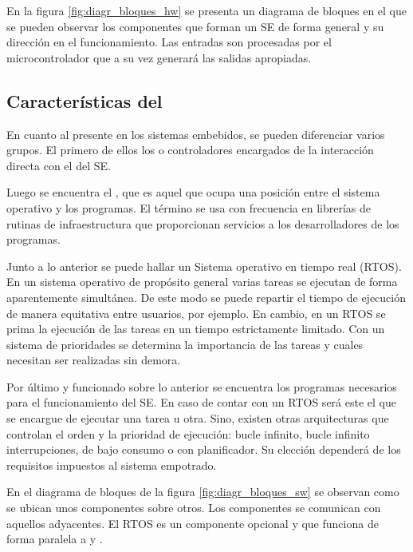 En la figura \ref{fig:diagr_bloques_hw} se presenta un diagrama de bloques
en el que se pueden observar los componentes que forman un SE de forma general
y su dirección en el funcionamiento. Las entradas son procesadas por el
microcontrolador que a su vez generará las salidas apropiadas.


\subsection{Características del }{\label{sec:se-sw}}
En cuanto al  presente en los sistemas embebidos, se
pueden diferenciar varios grupos. El primero de ellos los
 o controladores encargados de la interacción directa
con el  del SE.

Luego se encuentra el , que es aquel
 que ocupa una posición entre el sistema operativo y los
programas. El término se usa con frecuencia en librerías de rutinas de
infraestructura que proporcionan servicios a los desarrolladores de los
programas. \cite{butterfield2016}

Junto a lo anterior se puede hallar un Sistema operativo en tiempo real (RTOS).
En un sistema operativo de propósito general varias tareas se ejecutan de forma
aparentemente simultánea. De este modo se puede repartir el tiempo de ejecución
de manera equitativa entre usuarios, por ejemplo. En cambio, en un RTOS se prima
la ejecución de las tareas en un tiempo estrictamente limitado. Con un sistema
de prioridades se determina la importancia de las tareas y cuales necesitan ser
realizadas sin demora. \cite{webpage:amazon-rtos}

Por último y funcionado sobre lo anterior se encuentra los programas necesarios
para el funcionamiento del SE. En caso de contar con un RTOS será este el que se
encargue de ejecutar una tarea u otra. Sino, existen otras arquitecturas que
controlan el orden y la prioridad de ejecución: bucle infinito, bucle infinito 
interrupciones, de bajo consumo o con planificador. Su elección dependerá de los
requisitos impuestos al sistema empotrado.


En el diagrama de bloques de la figura \ref{fig:diagr_bloques_sw} se observan
como se ubican unos componentes sobre otros. Los componentes se comunican con
aquellos adyacentes. El RTOS es un componente opcional y que funciona de forma
paralela a  y .




